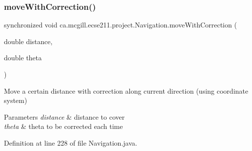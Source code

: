 \subsubsection{\texorpdfstring{move\+With\+Correction()}{moveWithCorrection()}}
{\footnotesize\ttfamily synchronized void ca.\+mcgill.\+ecse211.\+project.\+Navigation.\+move\+With\+Correction (\begin{DoxyParamCaption}\item[{double}]{distance,  }\item[{double}]{theta }\end{DoxyParamCaption})}

Move a certain distance with correction along current direction (using coordinate system)


\begin{DoxyParams}{Parameters}
{\em distance} & distance to cover \\
\hline
{\em theta} & theta to be corrected each time \\
\hline
\end{DoxyParams}


Definition at line 228 of file Navigation.\+java.



